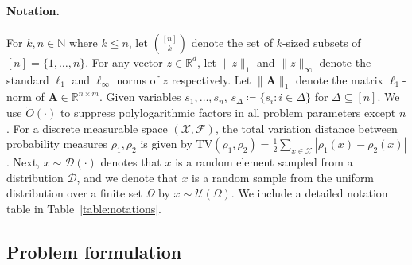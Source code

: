 \documentclass{article}
\theoremstyle{plain}
\theoremstyle{definition}
\def\N{\mathbb{N}}
\begin{document}
\paragraph{Notation.} For $k,n\in\N$ where $k\leq n$, let $\binom{[n]}{k}$ denote the set of $k$-sized subsets of $[n]=\{1,\dots,n\}$. For any vector $z\in\mathbb{R}^d$, let $\|z\|_1$ and $\|z\|_\infty$ denote the standard $\ell_1$ and $\ell_\infty$ norms of $z$ respectively.
Let $\|\mathbf{A}\|_1$ denote the matrix $\ell_1$-norm of $\mathbf{A}\in\mathbb{R}^{n\times m}$. Given variables $s_1,\dots,s_n$, $s_{\Delta}\coloneqq \{s_i:i\in\Delta\}$ for $\Delta\subseteq[n]$. We use $\tilde{O}(\cdot)$ to suppress polylogarithmic factors in all problem parameters except $n$. For a discrete measurable space $(\mathcal{X}, \mathcal{F})$, the total variation distance between probability measures $\rho_1, \rho_2$ is given by $\mathrm{TV}(\rho_1,\rho_2)=\frac{1}{2}\sum_{x\in\mathcal{X}}|\rho_1(x)-\rho_2(x)|$. Next, $x\sim \mathcal{D}(\cdot)$ denotes that $x$ is a random element sampled from a distribution $\mathcal{D}$, and we denote that $x$ is a random sample from the uniform distribution over a finite set $\Omega$ by $x\sim \mathcal{U}(\Omega)$. We include a detailed notation table in Table~\ref{table:notations}. 

\subsection{Problem formulation} 
\end{document}
